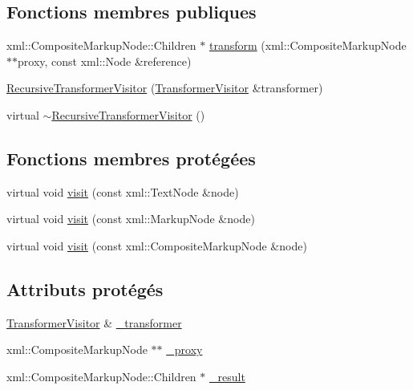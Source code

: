 \subsection*{Fonctions membres publiques}
\begin{DoxyCompactItemize}
\item 
xml::CompositeMarkupNode::Children $\ast$ \hyperlink{classxsl_1_1_recursive_transformer_visitor_ae22a3d073ffbc33532078dda218fbdb2}{transform} (xml::CompositeMarkupNode $\ast$$\ast$proxy, const xml::Node \&reference)
\item 
\hyperlink{classxsl_1_1_recursive_transformer_visitor_abcee48fdf4bf5d7d6bd7a5ab920f1132}{RecursiveTransformerVisitor} (\hyperlink{classxsl_1_1_transformer_visitor}{TransformerVisitor} \&transformer)
\item 
virtual \hyperlink{classxsl_1_1_recursive_transformer_visitor_aa66f42d68aeb112c2c03e756b1483474}{$\sim$RecursiveTransformerVisitor} ()
\end{DoxyCompactItemize}
\subsection*{Fonctions membres protégées}
\begin{DoxyCompactItemize}
\item 
virtual void \hyperlink{classxsl_1_1_recursive_transformer_visitor_a8b615dab8e58a7c7fedc369d1f89b334}{visit} (const xml::TextNode \&node)
\item 
virtual void \hyperlink{classxsl_1_1_recursive_transformer_visitor_aeba419bbc257271cb6738b07d6f2412c}{visit} (const xml::MarkupNode \&node)
\item 
virtual void \hyperlink{classxsl_1_1_recursive_transformer_visitor_a614cb6109ca9662729e24fb41246d146}{visit} (const xml::CompositeMarkupNode \&node)
\end{DoxyCompactItemize}
\subsection*{Attributs protégés}
\begin{DoxyCompactItemize}
\item 
\hyperlink{classxsl_1_1_transformer_visitor}{TransformerVisitor} \& \hyperlink{classxsl_1_1_recursive_transformer_visitor_a745c0d86fe855949ec55b4c872b02753}{\_\-transformer}
\item 
xml::CompositeMarkupNode $\ast$$\ast$ \hyperlink{classxsl_1_1_recursive_transformer_visitor_a2b1fad9f3e8d30781615c0bd63184495}{\_\-proxy}
\item 
xml::CompositeMarkupNode::Children $\ast$ \hyperlink{classxsl_1_1_recursive_transformer_visitor_a9ee4cc34eabc9cfbd87578942547d35f}{\_\-result}
\end{DoxyCompactItemize}


